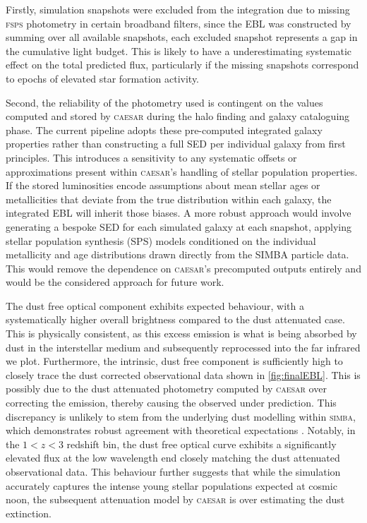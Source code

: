 \documentclass[
    a4paper, %
    10pt, %
    unnumberedsections, %
]{LTJournalArticle}
\begin{document}
Firstly, simulation snapshots were excluded from the integration due to missing \textsc{fsps} photometry in certain broadband filters, since the EBL was constructed by summing over all available snapshots, each excluded snapshot represents a gap in the cumulative light budget. This is likely to have a underestimating systematic effect on the total predicted flux, particularly if the missing snapshots correspond to epochs of elevated star formation activity.

Second, the reliability of the photometry used is contingent on the values computed and stored by \textsc{caesar} during the halo finding and galaxy cataloguing phase. The current pipeline adopts these pre-computed integrated galaxy properties rather than constructing a full SED per individual galaxy from first principles. This introduces a sensitivity to any systematic offsets or approximations present within \textsc{caesar}'s handling of stellar population properties. If the stored luminosities encode assumptions about mean stellar ages or metallicities that deviate from the true distribution within each galaxy, the integrated EBL will inherit those biases. A more robust approach would involve generating a bespoke SED for each simulated galaxy at each snapshot, applying stellar population synthesis (SPS) models conditioned on the individual metallicity and age distributions drawn directly from the SIMBA particle data. This would remove the dependence on \textsc{caesar}'s precomputed outputs entirely and would be the considered approach for future work.

The dust free optical component exhibits expected behaviour, with a systematically higher overall brightness compared to the dust attenuated case. This is physically consistent, as this excess emission is what is being absorbed by dust in the interstellar medium and subsequently reprocessed into the far infrared we plot. Furthermore, the intrinsic, dust free component is sufficiently high to closely trace the dust corrected observational data shown in \cref{fig:finalEBL}. This is possibly due to the dust attenuated photometry computed by \textsc{caesar} over correcting the emission, thereby causing the observed under prediction. This discrepancy is unlikely to stem from the underlying dust modelling within \textsc{simba}, which demonstrates robust agreement with theoretical expectations \cite{liDusttoGasDusttoMetalsRatio2019}. Notably, in the $1 < z < 3$ redshift bin, the dust free optical curve exhibits a significantly elevated flux at the low wavelength end closely matching the dust attenuated observational data. This behaviour further suggests that while the simulation accurately captures the intense young stellar populations expected at cosmic noon, the subsequent attenuation model by \textsc{caesar} is over estimating the dust extinction.
\end{document}
